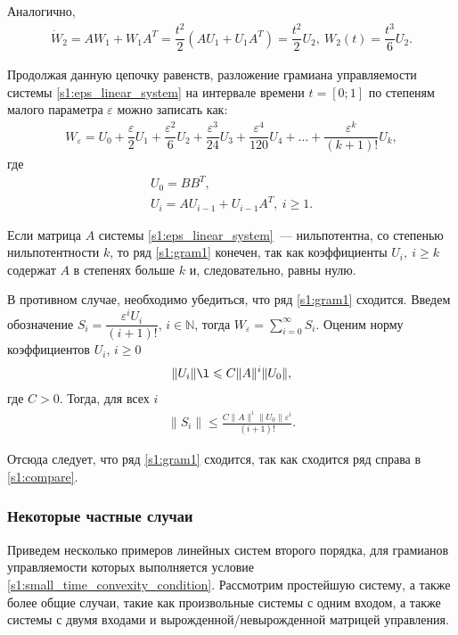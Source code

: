 \documentclass[../main.tex]{subfiles}
\begin{document}
Аналогично,
\begin{gather*}
    \dot{W}_2 = A W_1 + W_1 A^T = \dfrac{t^2}{2} \left( A U_1 + U_1 A^T \right) = \dfrac{t^2}{2} U_2 ,  \ W_2(t) = \dfrac{t^3}{6}U_2.
\end{gather*}
 
Продолжая данную цепочку равенств, разложение грамиана управляемости системы \eqref{s1:eps_linear_system} на интервале времени $t = [0;1] $ по степеням малого параметра $ \varepsilon $ можно записать как:
\begin{gather}\label{s1:gram1}
    W_{\varepsilon} = U_0 + \dfrac{\varepsilon}{2}U_1 + \dfrac{\varepsilon^2}{6} U_2 + \dfrac{\varepsilon^3}{24}U_3 + \dfrac{\varepsilon^4}{120}U_4 + \dots + \dfrac{\varepsilon^k}{(k+1)!}U_k,
\end{gather}
где
\begin{gather*}
    U_0 = B B^T, \\
    U_i  = A U_{i-1} + U_{i-1} A^T, \ i \geqslant 1.
\end{gather*}
 
Если матрица $ A $ системы \eqref{s1:eps_linear_system}~--- нильпотентна, со степенью нильпотентности $ k $, то ряд \eqref{s1:gram1} конечен, так как коэффициенты $ U_i, \ i \geqslant k$ содержат $ A $ в степенях больше $ k$ и, следовательно, равны нулю.

В противном случае, необходимо убедиться, что ряд  \eqref{s1:gram1}  сходится. 
Введем обозначение $ S_i = \dfrac{\varepsilon^i U_i}{(i + 1)!} $, $i \in \mathbb{N}$, тогда $W_{\varepsilon} = \sum\limits_{i = 0}^{\infty} S_i$.
Оценим норму коэффициентов $ U_i $, $ i \geqslant 0$
\begin{gather*}
	\| U_i \| \l \leqslant C \|A\|^i \|U_0\|, 
\end{gather*}
где $C > 0$. 
Тогда, для всех $i$
\begin{gather}\label{s1:compare}
		\|S_i\| \leqslant \frac{C \|A\|^i \|U_0\| \varepsilon^i}{(i + 1)!}.
\end{gather} 
 
 Отсюда следует, что ряд \eqref{s1:gram1} сходится, так как сходится ряд справа в \eqref{s1:compare}.
 
\subsubsection{Некоторые частные случаи}
Приведем  несколько примеров линейных систем второго порядка, для грамианов управляемости которых выполняется условие \eqref{s1:small_time_convexity_condition}.
Рассмотрим простейшую систему, а также более общие случаи, такие как произвольные системы с одним входом, а также системы с двумя входами и вырожденной/невырожденной матрицей управления.
\end{document}
